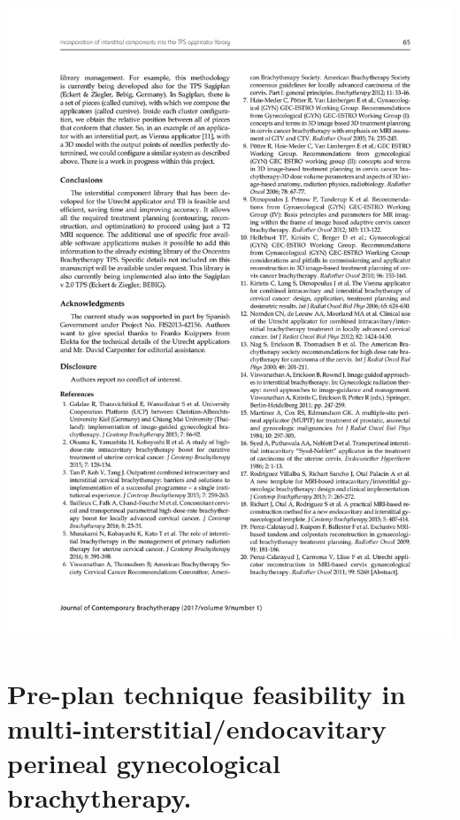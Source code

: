 \documentclass[
  a4paper,
]{scrreprt}
\begin{document}
\includegraphics{articulos/librerias/librerias-7.png}

\hypertarget{pre-plan-technique-feasibility-in-multi-interstitialendocavitary-perineal-gynecological-brachytherapy.}{%
\section{Pre-plan technique feasibility in
multi-interstitial/endocavitary perineal gynecological
brachytherapy.}\label{pre-plan-technique-feasibility-in-multi-interstitialendocavitary-perineal-gynecological-brachytherapy.}}

\newpage{}
\end{document}
